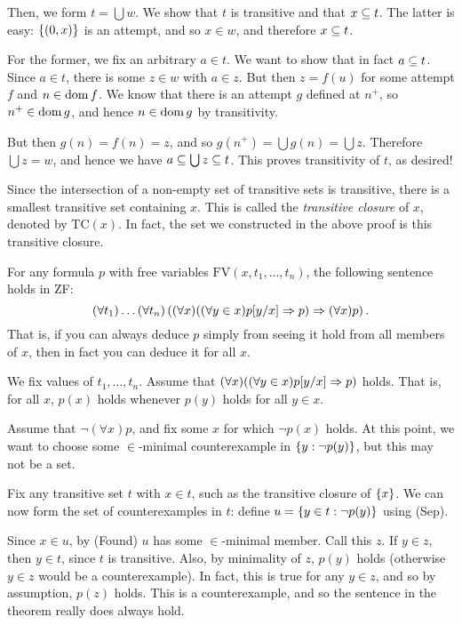 \documentclass{article}
\begin{document}
\begin{prf}
	Then, we form $t = \bigcup w$. We show that $t$ is transitive and that $x \subseteq t$. The latter is easy: $\left\lbrace (0, x) \right\rbrace$ is an attempt, and so $x \in w$, and therefore $x \subseteq t$.
	
	For the former, we fix an arbitrary $a \in t$. We want to show that in fact $a \subseteq t$. Since $a \in t$, there is some $z \in w$ with $a \in z$. But then $z = f(u)$ for some attempt $f$ and $n \in \operatorname{dom} f$. We know that there is an attempt $g$ defined at $n^+$, so $n^+ \in \operatorname{dom} g$, and hence $n \in \operatorname{dom} g$ by transitivity.
	
	But then $g(n) = f(n) = z$, and so $g(n^+) = \bigcup g(n) = \bigcup z$. Therefore $\bigcup z = w$, and hence we have $a \subseteq \bigcup z \subseteq t$. This proves transitivity of $t$, as desired!
\end{prf}

\begin{corollary}
    Since the intersection of a non-empty set of transitive sets is transitive, there is a smallest transitive set containing $x$. This is called the \textit{transitive closure} of $x$, denoted by $\mathrm{TC}(x)$. In fact, the set we constructed in the above proof is this transitive closure.
\end{corollary}

\begin{theorem}
    For any formula $p$ with free variables $\mathrm{FV}(x, t_1, \dots, t_n)$, the following sentence holds in ZF:
    \[
	(\forall t_1) \dots (\forall t_n)
	\left( (\forall x)((\forall y \in x) p[y/x] \Rightarrow p) \Rightarrow (\forall x)p \right).
	\]
	That is, if you can always deduce $p$ simply from seeing it hold from all members of $x$, then in fact you can deduce it for all $x$.
\end{theorem}

\begin{prf}
    We fix values of $t_1, \dots, t_n$. Assume that $(\forall x)((\forall y \in x) p[y/x] \Rightarrow p)$ holds. That is, for all $x$, $p(x)$ holds whenever $p(y)$ holds for all $y \in x$.
    
    Assume that $\lnot (\forall x) p$, and fix some $x$ for which $\lnot p(x)$ holds. At this point, we want to choose some $\in$-minimal counterexample in $\left\lbrace y : \lnot p(y) \right\rbrace$, but this may not be a set.
    
    Fix any transitive set $t$ with $x \in t$, such as the transitive closure of $\left\lbrace x \right\rbrace$. We can now form the set of counterexamples in $t$: define $u = \left\lbrace y \in t : \lnot p(y) \right\rbrace$ using (Sep).
    
    Since $x \in u$, by (Found) $u$ has some $\in$-minimal member. Call this $z$. If $y \in z$, then $y \in t$, since $t$ is transitive. Also, by minimality of $z$, $p(y)$ holds (otherwise $y \in z$ would be a counterexample). In fact, this is true for any $y \in z$, and so by assumption, $p(z)$ holds. This is a counterexample, and so the sentence in the theorem really does always hold.
\end{prf}
\end{document}
